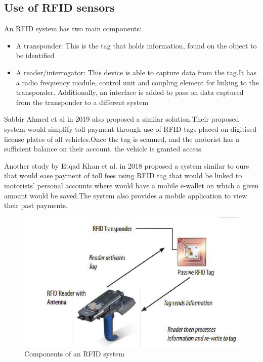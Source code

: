 \subsection{Use of RFID sensors}
An RFID system has two main components:
\begin{itemize}
    \item A transponder: This is the tag that holds information, found on the object to be identified
    \item A reader/interrogator: This device is able to capture data from the tag.It has a radio frequency module,  control unit and coupling element for linking to the transponder. Additionally, an interface is added to pass on data captured from the transponder to a different system
\end{itemize}


Sabbir Ahmed et al in 2019 also proposed a similar solution.Their proposed system would simplify toll payment through use of RFID tags placed on digitised license plates of all vehicles.Once the tag is scanned, and the motorist has a sufficient balance on their account, the vehicle is granted access\cite{ahmed_automated_2019}.


Another study by Etqad Khan et al. in 2018 proposed a system similar to ours that would ease payment of toll fees using RFID tag that would be linked to motorists' personal accounts where would have a mobile e-wallet on which a given amount would be saved.The system also provides a mobile application to view their past payments\cite{khan_automated_2018}.

\begin{figure}
    \begin{center}
        \includegraphics[scale = 0.3]{images/rfid-pic}
        \caption{Components of an RFID system}
    \end{center}
\end{figure}

